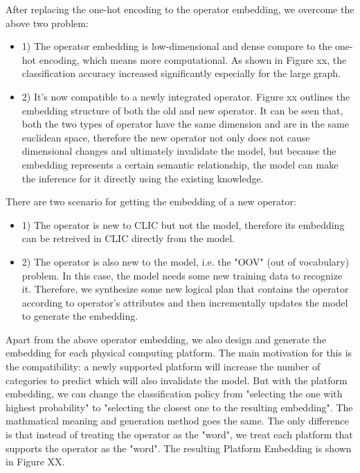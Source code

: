 After replacing the one-hot encoding to the operator embedding, we overcome the above two problem: 
\begin{itemize}
    \item 1) The operator embedding is low-dimensional and dense compare to the one-hot encoding, which means more computational. 
    As shown in Figure xx, the classification accuracy increased significantly especially for the large graph. 
    \item 2) It's now compatible to a newly integrated operator. 
    Figure xx outlines the embedding structure of both the old and new operator. 
    It can be seen that, both the two types of operator have the same dimension and are in the same euclidean space, therefore the new operator not only does not cause dimensional changes and ultimately invalidate the model, but because the embedding represents a certain semantic relationship, the model can make the inference for it directly using the existing knowledge. 
\end{itemize}

There are two scenario for getting the embedding of a new operator:
\begin{itemize}
    \item 1) The operator is new to CLIC but not the model, therefore its embedding can be retreived in CLIC directly from the model.
    \item 2) The operator is also new to the model, i.e. the "OOV" (out of vocabulary) problem. 
    In this case, the model needs some new training data to recognize it. 
    Therefore, we synthesize some new logical plan that contains the operator according to operator's attributes and then incrementally updates the model to generate the embedding.
\end{itemize}

Apart from the above operator embedding, we also design and generate the embedding for each physical computing platform. 
The main motivation for this is the compatibility: a newly supported platform will increase the number of categories to predict which will also invalidate the model. 
But with the platform embedding, we can change the classification policy from "selecting the one with highest probability" to "selecting the closest one to the resulting embedding". 
The mathmatical meaning and generation method goes the same. 
The only difference is that instead of treating the operator as the "word", we treat each platform that supports the operator as the "word". 
The resulting Platform Embedding is shown in Figure XX.

